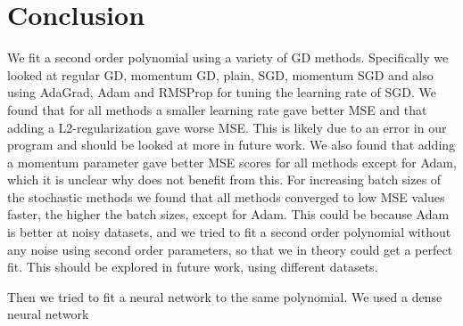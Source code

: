 \section{Conclusion}

We fit a second order polynomial using a variety of GD methods. Specifically we
looked at regular GD, momentum GD, plain, SGD, momentum SGD and also using AdaGrad, Adam 
and RMSProp for tuning the learning rate of SGD. We found that for all methods
a smaller learning rate gave better MSE and that adding a L2-regularization
gave worse MSE. This is likely due to an error in our program and should be
looked at more in future work. We also found that adding a momentum parameter
gave better MSE scores for all methods except for Adam, which it is unclear why
does not benefit from this.
For increasing batch sizes of the stochastic methods we found that all methods
converged to low MSE values faster, the higher the batch sizes, except for
Adam. This could be because Adam is better at noisy datasets, and we tried to
fit a second order polynomial without any noise using second order parameters,
so that we in theory could get a perfect fit. This should be explored in future
work, using different datasets.


Then we tried to fit a neural network to the same polynomial. We used a dense
neural network  


